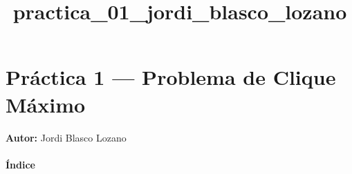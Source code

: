 \documentclass[11pt]{article}
\title{practica\_01\_jordi\_blasco\_lozano}
\begin{document}
    
    \maketitle
    
    

    
    \section{Práctica 1 --- Problema de Clique
Máximo}\label{pruxe1ctica-1-problema-de-clique-muxe1ximo}

\textbf{Autor:} Jordi Blasco Lozano

    \paragraph{Índice}\label{uxedndice}
\end{document}
